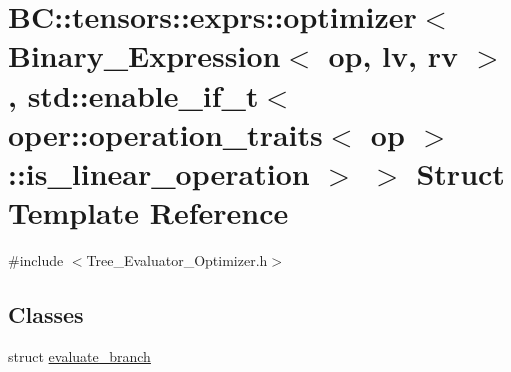 \hypertarget{structBC_1_1tensors_1_1exprs_1_1optimizer_3_01Binary__Expression_3_01op_00_01lv_00_01rv_01_4_00_f6303e0a787eb8566b71e5cc034a3dd8}{}\section{BC\+:\+:tensors\+:\+:exprs\+:\+:optimizer$<$ Binary\+\_\+\+Expression$<$ op, lv, rv $>$, std\+:\+:enable\+\_\+if\+\_\+t$<$ oper\+:\+:operation\+\_\+traits$<$ op $>$\+:\+:is\+\_\+linear\+\_\+operation $>$ $>$ Struct Template Reference}
\label{structBC_1_1tensors_1_1exprs_1_1optimizer_3_01Binary__Expression_3_01op_00_01lv_00_01rv_01_4_00_f6303e0a787eb8566b71e5cc034a3dd8}


{\ttfamily \#include $<$Tree\+\_\+\+Evaluator\+\_\+\+Optimizer.\+h$>$}

\subsection*{Classes}
\begin{DoxyCompactItemize}
\item 
struct \hyperlink{structBC_1_1tensors_1_1exprs_1_1optimizer_3_01Binary__Expression_3_01op_00_01lv_00_01rv_01_4_00_6a19fcc06d75e5982db96f21da6252c0}{evaluate\+\_\+branch}
\end{DoxyCompactItemize}
